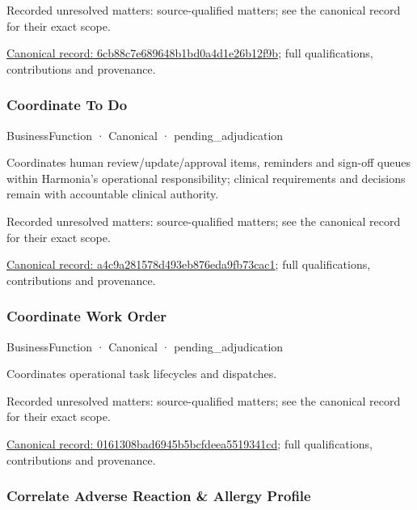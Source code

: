 {\small Recorded unresolved matters: source-qualified matters; see the canonical record for their exact scope.}\par
{\footnotesize \href{../../../../continuum/business/business-function/6cb88c7e689648b1bd0a4d1e26b12f9b.md}{Canonical record: 6cb88c7e689648b1bd0a4d1e26b12f9b}; full qualifications, contributions and provenance.}\par
\subsubsection{Coordinate To Do}

\label{element:a4c9a281578d493eb876eda9fb73cac1}
{\small BusinessFunction · Canonical · pending\_adjudication}\par

Coordinates human review/update/approval items, reminders and sign-off queues within Harmonia's operational responsibility; clinical requirements and decisions remain with accountable clinical authority.


{\small Recorded unresolved matters: source-qualified matters; see the canonical record for their exact scope.}\par
{\footnotesize \href{../../../../continuum/business/business-function/a4c9a281578d493eb876eda9fb73cac1.md}{Canonical record: a4c9a281578d493eb876eda9fb73cac1}; full qualifications, contributions and provenance.}\par
\subsubsection{Coordinate Work Order}

\label{element:0161308bad6945b5bcfdeea5519341cd}
{\small BusinessFunction · Canonical · pending\_adjudication}\par

Coordinates operational task lifecycles and dispatches.


{\small Recorded unresolved matters: source-qualified matters; see the canonical record for their exact scope.}\par
{\footnotesize \href{../../../../continuum/business/business-function/0161308bad6945b5bcfdeea5519341cd.md}{Canonical record: 0161308bad6945b5bcfdeea5519341cd}; full qualifications, contributions and provenance.}\par
\subsubsection{Correlate Adverse Reaction \& Allergy Profile}

